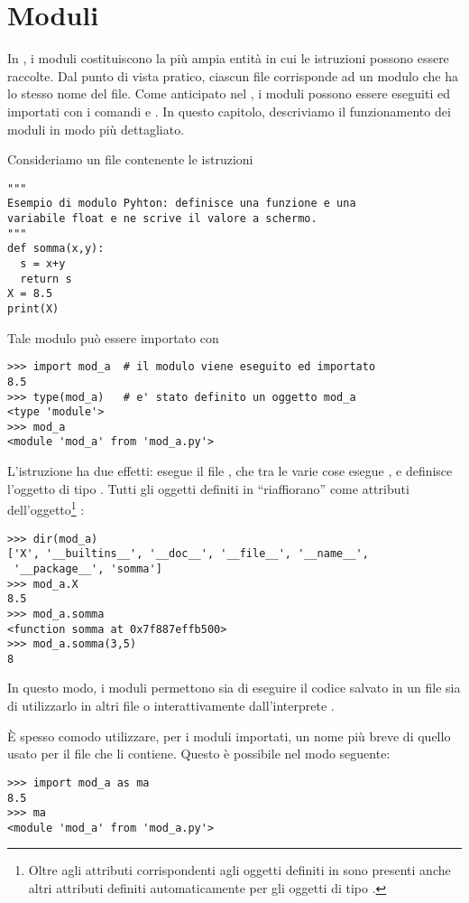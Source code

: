 \chapter{Moduli}
\label{moduli}

In \python, i moduli costituiscono la pi\`u ampia entit\`a in cui le
istruzioni possono essere raccolte. Dal punto di vista pratico,
ciascun file corrisponde ad un modulo che ha lo stesso nome del file.
Come anticipato nel , i moduli
possono essere eseguiti ed importati con i comandi  e
. In questo capitolo, descriviamo il funzionamento dei
moduli in modo pi\`u dettagliato.

Consideriamo un file  contenente le istruzioni
\begin{verbatim}
"""
Esempio di modulo Pyhton: definisce una funzione e una
variabile float e ne scrive il valore a schermo.
"""
def somma(x,y):
  s = x+y
  return s
X = 8.5
print(X)
\end{verbatim}
Tale modulo pu\`o essere importato con
\begin{verbatim}
>>> import mod_a  # il modulo viene eseguito ed importato
8.5
>>> type(mod_a)   # e' stato definito un oggetto mod_a
<type 'module'>
>>> mod_a
<module 'mod_a' from 'mod_a.py'>
\end{verbatim}
L'istruzione  ha due effetti: esegue il file
, che tra le varie cose esegue , e
definisce l'oggetto  di tipo . Tutti gli
oggetti definiti in  ``riaffiorano'' come attributi
dell'oggetto\footnote{Oltre agli attributi corrispondenti agli oggetti
definiti in  sono presenti anche altri attributi
definiti automaticamente per gli oggetti di tipo .}
:
\begin{verbatim}
>>> dir(mod_a)
['X', '__builtins__', '__doc__', '__file__', '__name__',
 '__package__', 'somma']
>>> mod_a.X
8.5
>>> mod_a.somma
<function somma at 0x7f887effb500>
>>> mod_a.somma(3,5)
8
\end{verbatim}
In questo modo, i moduli permettono sia di eseguire il codice salvato in
un file sia di utilizzarlo in altri file o interattivamente
dall'interprete \python.

\`E spesso comodo utilizzare, per i moduli importati, un nome pi\`u
breve di quello usato per il file che li contiene. Questo \`e
possibile nel modo seguente:
\begin{verbatim}
>>> import mod_a as ma
8.5
>>> ma
<module 'mod_a' from 'mod_a.py'>
\end{verbatim}

